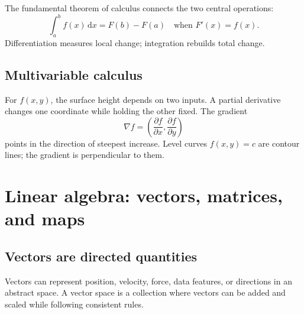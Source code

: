\documentclass[11pt,oneside,openany]{book}
\newcommand{\dd}{\,\mathrm{d}}
\begin{document}
The fundamental theorem of calculus connects the two central operations:
\[
  \int_a^b f(x)\dd x=F(b)-F(a)\quad\text{when }F'(x)=f(x).
\]
Differentiation measures local change; integration rebuilds total change.

\section{Multivariable calculus}

For $f(x,y)$, the surface height depends on two inputs. A partial derivative changes one coordinate while holding the other fixed. The gradient
\[
  \nabla f=\left(\frac{\partial f}{\partial x},\frac{\partial f}{\partial y}\right)
\]
points in the direction of steepest increase. Level curves $f(x,y)=c$ are contour lines; the gradient is perpendicular to them.

\begin{center}
\end{center}

\chapter{Linear algebra: vectors, matrices, and maps}

\section{Vectors are directed quantities}

Vectors can represent position, velocity, force, data features, or directions in an abstract space. A vector space is a collection where vectors can be added and scaled while following consistent rules.
\end{document}
